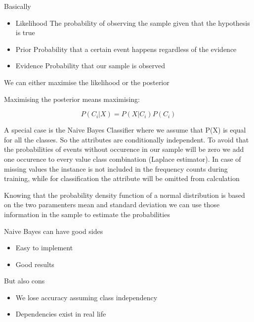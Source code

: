 Basically

\begin{itemize}
    \item Likelihood \ra The probability of observing the sample given that the hypothesis is true
    \item Prior \ra Probability that a certain event happens regardless of the evidence
    \item Evidence \ra Probability that our sample is observed
\end{itemize}

We can either maximise the likelihood or the posterior

\vspace{10pt}

Maximising the posterior means maximising:

\begin{equation}
    P(C_i|X) = P(X|C_i)P(C_i)
\end{equation}

\vspace{10pt}

A special case is the Naive Bayes Classifier where we assume that P(X) is equal for all the classes.
So the attributes are conditionally independent.
To avoid that the probabilities of events without occurence in our sample will be zero we add one occurence to every value class combination (Laplace estimator).
In case of missing values the instance is not included in the frequency counts during training, while for classification the attribute will be omitted from calculation

\vspace{10pt}

Knowing that the probability density function of a normal distribution is based on the two paramenters mean and standard deviation we can
use those information in the sample to estimate the probabilities

\vspace{10pt}

Naive Bayes can have good sides

\begin{itemize}
    \item Easy to implement
    \item Good results
\end{itemize}

\vspace{10pt}

But also cons 
\begin{itemize}
    \item We lose accuracy assuming class independency
    \item Dependencies exist in real life 
\end{itemize}

